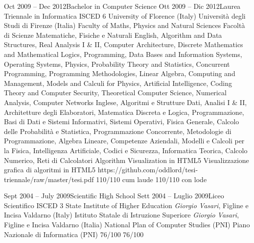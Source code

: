 {    \school
    {Oct 2009 -- Dec 2012}{Bachelor in Computer Science}
    {Ott 2009 -- Dic 2012}{Laurea Triennale in Informatica}
    {ISCED 6}
      \schoolLocation
        {University of Florence (Italy)}
        {Università degli Studi di Firenze (Italia)}
      \schoolFaculty
        {Faculty of Maths, Physics and Natural Sciences}
        {Facoltà di Scienze Matematiche, Fisiche e Naturali}
      \courses
        {English, Algorithm and Data Structures, Real Analysis I \& II, Computer Architecture, Discrete Mathematics and Mathematical Logics, Programming, Data Bases and Information Systems, Operating Systems, Physics, Probability Theory and Statistics, Concurrent Programming, Programming Methodologies, Linear Algebra, Computing and Management, Models and Calculi for Physics, Artificial Intelligence, Coding Theory and Computer Security, Theoretical Computer Science, Numerical Analysis, Computer Networks}
        {Inglese, Algoritmi e Strutture Dati, Analisi I \& II, Architetture degli Elaboratori, Matematica Discreta e Logica, Programmazione, Basi di Dati e Sistemi Informativi, Sistemi Operativi, Fisica Generale, Calcolo delle Probabilità e Statistica, Programmazione Concorrente, Metodologie di Programmazione, Algebra Lineare, Competenze Aziendali, Modelli e Calcoli per la Fisica, Intelligenza Artificiale, Codici e Sicurezza, Informatica Teorica, Calcolo Numerico, Reti di Calcolatori}
      \thesisURL
        {Algorithm Visualization in HTML5}
        {Visualizzazione grafica di algoritmi in HTML5}
        {https://github.com/oddlord/tesi-triennale/raw/master/tesi.pdf}
      \finalRank
        {110/110 cum laude}
        {110/110 con lode}
    
    \school
    {Sept 2004 -- July 2009}{Scientific High School}
    {Sett 2004 -- Luglio 2009}{Liceo Scientifico}
    {ISCED 3}
      \schoolLocation
        {State Institute of Higher Education \textit{Giorgio Vasari}, Figline e Incisa Valdarno (Italy)}
        {Istituto Statale di Istruzione Superiore \textit{Giorgio Vasari}, Figline e Incisa Valdarno (Italia)}
      \schoolFaculty
        {National Plan of Computer Studies (PNI)}
        {Piano Nazionale di Informatica (PNI)}
      \finalRank
        {76/100}
        {76/100}


}
